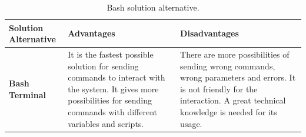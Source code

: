 \documentclass[11pt]{report} %
\begin{document}
\begin{table}[H]
\begin{center}
    \begin{tabular}{M{6.6cm}M{3.3cm}M{3.3cm}}
    \hline
    \textbf{Solution Alternative} & \textbf{Advantages} & \textbf{Disadvantages} \\ 
    \hline

    \textbf{Bash Terminal}
    

    \citep{cite_bash_terminal}
    
    &
    
    It is the fastest possible solution for sending commands to interact with the system. It gives more possibilities for sending commands with different variables and scripts.
    
    &
    
    There are more possibilities of sending wrong commands, wrong parameters and errors. It is not friendly for the interaction. A great technical knowledge is needed for its usage.
    
    \\ \hline
    \end{tabular}
\caption{\label{tab:bash} Bash solution alternative.}
\end{center}
\end{table}
\end{document}
